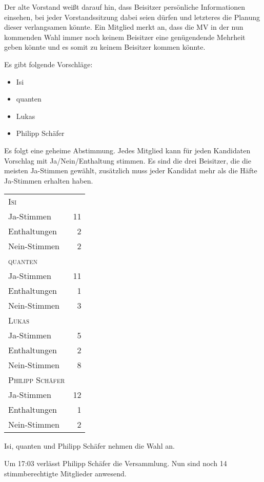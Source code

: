 \documentclass[DIV=calc,parksip=half*]{scrartcl}
\newcommand{\fiveop}{Philipp Schäfer}
\newcommand{\quanten}{quanten}
\newcommand{\isi}{Isi}
\begin{document}
Der alte Vorstand weißt darauf hin, dass Beisitzer persönliche Informationen einsehen, bei jeder Vorstandssitzung dabei seien dürfen und letzteres die Planung dieser verlangsamen könnte. Ein Mitglied merkt an, dass die MV in der nun kommenden Wahl immer noch keinem Beisitzer eine genügendende Mehrheit geben könnte und es somit zu keinem Beisitzer kommen könnte. 

Es gibt folgende Vorschläge:
\begin{itemize}
 \item \isi{}
 \item \quanten{}
 \item Lukas
 \item \fiveop{}
\end{itemize}

Es folgt eine geheime Abstimmung. Jedes Mitglied kann für jeden Kandidaten Vorschlag mit Ja/Nein/Enthaltung stimmen. Es sind die drei Beisitzer, die die meisten Ja-Stimmen gewählt, zusätzlich muss jeder Kandidat mehr als die Häfte Ja-Stimmen erhalten haben.

\begin{tabularx}{\linewidth}{Xr}
    \toprule
    \textsc{\isi{}}\\
    Ja-Stimmen & 11 \\
    Enthaltungen & 2 \\
    Nein-Stimmen & 2 \\
    \midrule
    \textsc{\quanten{}}\\
    Ja-Stimmen & 11 \\
    Enthaltungen & 1 \\
    Nein-Stimmen & 3 \\
    \midrule
    \textsc{Lukas}\\
    Ja-Stimmen & 5 \\
    Enthaltungen & 2 \\
    Nein-Stimmen & 8 \\
    \midrule
    \textsc{\fiveop{}}\\
    Ja-Stimmen & 12 \\
    Enthaltungen & 1 \\
    Nein-Stimmen & 2 \\
    \bottomrule
\end{tabularx}
\par

\isi{}, \quanten{} und \fiveop{} nehmen die Wahl an.


Um 17:03 verlässt \fiveop{} die Versammlung. Nun sind noch 14 stimmberechtigte Mitglieder anwesend.
\end{document}
